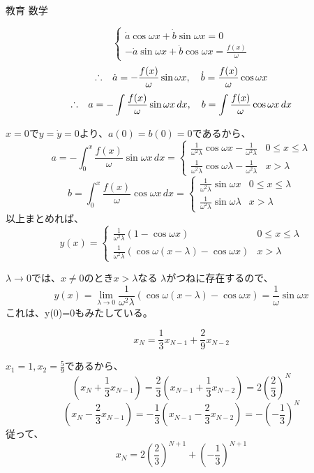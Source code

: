\documentclass[fleqn]{jbook}
\begin{document}
\begin{answer}{教育 数学}{}
\begin{subanswers}
\begin{subsubanswers}
\SubSubAnswer
\[ 
\left\{ 
\begin{array}{l}
\dot a \cos\omega x + \dot b \sin\omega x=0\\
-\dot a \sin\omega x + \dot b \cos\omega x=\frac{f(x)}{\omega}
\end{array}
\right. 
\]
\[ 
\Yueni \dot a = -\frac{f(x)}{\omega}\sin\omega x,
\quad \dot b = \frac{f(x)}{\omega}\cos\omega x 
\]
\[ 
\Yueni a = - \int \frac{f(x)}{\omega}\sin\omega x \,dx,
\quad b = \int \frac{f(x)}{\omega}\cos\omega x \,dx 
\]

\SubSubAnswer
$x=0$で$y=\dot y=0$より、$a(0)=b(0)=0$であるから、
\[ a = - \int_0^x \frac{f(x)}{\omega}\sin\omega x \,dx
= \left\{ \begin{array}{ll}
\frac{1}{\omega^2
  \lambda}\cos\omega x-\frac{1}{\omega^2\lambda} & 0 \leq x \leq \lambda\\
\frac{1}{\omega^2
  \lambda}\cos\omega \lambda-\frac{1}{\omega^2\lambda} & x > \lambda
\end{array} \right. \]
\[ b = \int_0^x \frac{f(x)}{\omega}\cos\omega x\,dx=
\left\{ \begin{array}{ll}
\frac{1}{\omega^2\lambda}\sin\omega x & 0 \leq x \leq \lambda\\
\frac{1}{\omega^2\lambda}\sin\omega\lambda & x > \lambda
\end{array} \right. \]
以上まとめれば、
\[ y(x) = \left\{ \begin{array}{ll}
\frac{1}{\omega^2\lambda}(1-\cos\omega x) & 0 \leq x \leq \lambda\\
\frac{1}{\omega^2\lambda}(\cos\omega(x-\lambda)-\cos\omega x) & x > \lambda
\end{array} \right.
\]

\SubSubAnswer
$\lambda\rightarrow0$では、$x \neq 0$のとき$x > \lambda$なる
$\lambda$がつねに存在するので、
\[
y(x) = \lim_{\lambda\rightarrow0}
\frac{1}{\omega^2\lambda}(\cos\omega(x-\lambda)-\cos\omega x) 
= \frac{1}{\omega}\sin\omega x 
\]
これは、y(0)=0もみたしている。
\end{subsubanswers}

\SubAnswer
\begin{subsubanswers}
\SubSubAnswer
\[ x_N=\frac{1}{3}x_{N-1}+\frac{2}{9}x_{N-2} \]

\SubSubAnswer
$x_1=1,x_2=\frac{5}{9}$であるから、
\[ \left(x_N+\frac{1}{3}x_{N-1}\right)=\frac{2}{3}\left(x_{N-1}+\frac{1}{3}x_{N-2}\right)=2\left(\frac{2}{3}\right)^N \]
\[ \left(x_N-\frac{2}{3}x_{N-1}\right)=-\frac{1}{3}\left(x_{N-1}-\frac{2}{3}x_{N-2}\right)=-\left(-\frac{1}{3}\right)^N \]
従って、
\[ x_N=2\left(\frac{2}{3}\right)^{N+1}+\left(-\frac{1}{3}\right)^{N+1} \]


\end{subsubanswers}
\end{subanswers}
\end{answer}
\end{document}
